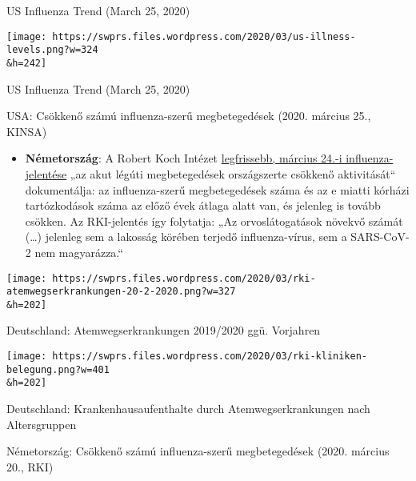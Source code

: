 US Influenza Trend (March 25, 2020)

\href{https://swprs.org/covid-19-hinweis-ii/us-illness-levels/}{}

\texttt{[image: https://swprs.files.wordpress.com/2020/03/us-illness-levels.png?w=324\\\&h=242]}

US Influenza Trend (March 25, 2020)

USA: Csökkenő számú influenza-szerű megbetegedések (2020. március 25.,
KINSA)

\begin{itemize}
\tightlist
\item
  \textbf{Németország}: A Robert Koch Intézet
  \href{https://influenza.rki.de/Wochenberichte/2019_2020/2020-12.pdf}{legfrissebb,
  március 24.-i influenza-jelentése} „az akut légúti megbetegedések
  országszerte csökkenő aktivitását`` dokumentálja: az influenza-szerű
  megbetegedések száma és az e miatti kórházi tartózkodások száma az
  előző évek átlaga alatt van, és jelenleg is tovább csökken. Az
  RKI-jelentés így folytatja: „Az orvoslátogatások növekvő számát
  (\ldots{}) jelenleg sem a lakosság körében terjedő influenza-vírus,
  sem a SARS-CoV-2 nem magyarázza.``
\end{itemize}

\href{https://swprs.org/covid-19-hinweis-ii/rki-atemwegserkrankungen-20-2-2020/}{}

\texttt{[image: https://swprs.files.wordpress.com/2020/03/rki-atemwegserkrankungen-20-2-2020.png?w=327\\\&h=202]}

Deutschland: Atemwegserkrankungen 2019/2020 ggü. Vorjahren

\href{https://swprs.org/covid-19-hinweis-ii/rki-kliniken-belegung/}{}

\texttt{[image: https://swprs.files.wordpress.com/2020/03/rki-kliniken-belegung.png?w=401\\\&h=202]}

Deutschland: Krankenhausaufenthalte durch Atemwegserkrankungen nach
Altersgruppen

Németország: Csökkenő számú influenza-szerű megbetegedések (2020.
március 20., RKI)

